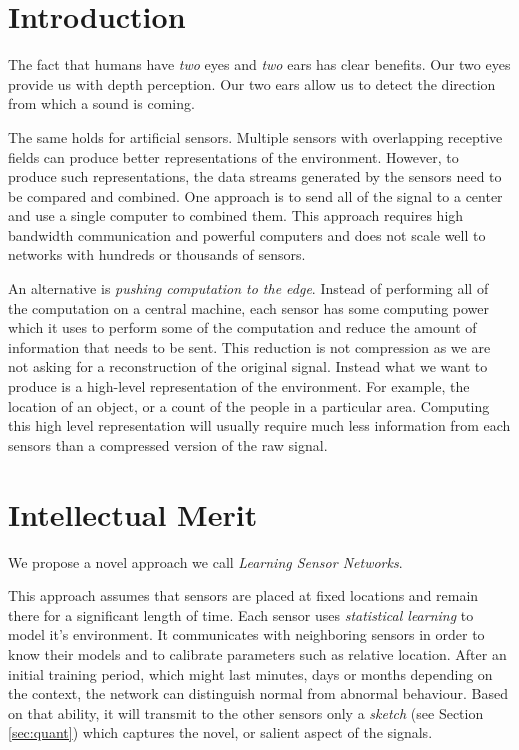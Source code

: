 \section{Introduction}
The fact that humans have {\em two} eyes and {\em two} ears has clear
benefits. Our two eyes provide us with depth perception. Our two ears
allow us to detect the direction from which a sound is coming.

The same holds for artificial sensors. Multiple sensors with
overlapping receptive fields can produce better representations of the
environment. However, to produce such representations, the data
streams generated by the sensors need to be compared and combined. One
approach is to send all of the signal to a center and use a single
computer to combined them. This approach requires high bandwidth
communication and powerful computers and does not scale well to
networks with hundreds or thousands of sensors.

An alternative is {\em pushing computation to the edge}. Instead of
performing all of the computation on a central machine, each sensor
has some computing power which it uses to perform some of the
computation and reduce the amount of information that needs to be
sent. This reduction is not compression as we are not asking for a
reconstruction of the original signal. Instead what we want to produce
is a high-level representation of the environment. For example, the
location of an object, or a count of the people in a particular
area. Computing this high level representation will usually require
much less information from each sensors than a compressed version of
the raw signal.

\section{Intellectual Merit}

\iffalse
We propose a novel approach we call {\em Learning Sensor Networks}.


This approach assumes that sensors are placed at fixed locations and
remain there for a significant length of time.  Each sensor uses {\em
  statistical learning} to model it's environment. It communicates
with neighboring sensors in order to know their models and to
calibrate parameters such as relative location. After an initial
training period, which might last minutes, days or months depending on
the context, the network can distinguish normal from abnormal
behaviour. Based on that ability, it will transmit to the other
sensors only a {\em sketch} (see Section \ref{sec:quant}) which captures the novel, or
salient aspect of the signals.

